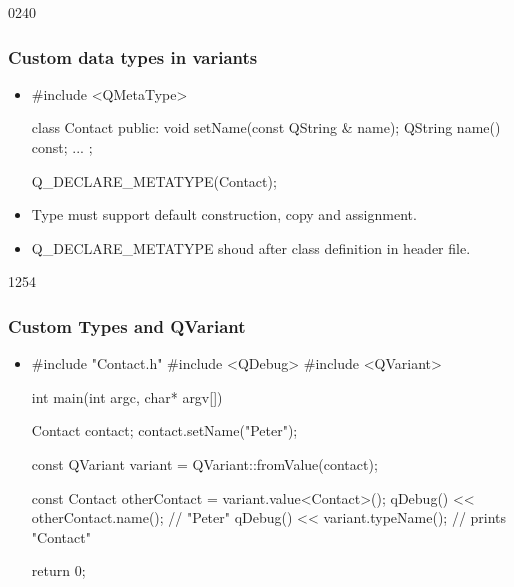 \begin{slide}[fragile]{0240}
\frametitle{Custom data types in variants}
\begin{itemize}
\item[]
\begin{cpp}
#include <QMetaType>

class Contact
{
  public:
    void setName(const QString & name);
    QString name() const;
  ...
};

Q_DECLARE_METATYPE(Contact);
\end{cpp}\medskip
\item Type must support default construction, copy and assignment.\medskip
\item Q\_DECLARE\_METATYPE shoud after class definition in header file.

\medskip
{}
\end{itemize}
\end{slide}

\begin{slide}[fragile]{1254}
\frametitle{Custom Types and QVariant}

\begin{itemize}
\item[]
\begin{cpp}
#include "Contact.h"
#include <QDebug>
#include <QVariant>

int main(int argc, char* argv[])
{
    Contact contact;
    contact.setName("Peter");

    const QVariant variant = QVariant::fromValue(contact);

    const Contact otherContact = variant.value<Contact>();
    qDebug() << otherContact.name(); // "Peter"
    qDebug() << variant.typeName();  // prints "Contact"

    return 0;
}
\end{cpp}
\end{itemize}
\end{slide}

